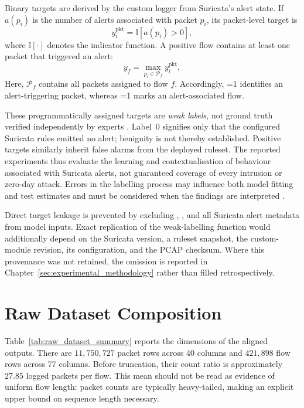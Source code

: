 \documentclass[11pt,fleqn]{report}
\begin{document}
Binary targets are derived by the custom logger from Suricata's alert state. If $a(p_i)$ is the number of alerts associated with packet $p_i$, its packet-level target is
\begin{equation}
    y_i^{\mathrm{pkt}}
    = \mathbb{I}\!\left[a(p_i)>0\right],
    \label{eq:packet_alert_label}
\end{equation}
where $\mathbb{I}[\cdot]$ denotes the indicator function. A positive flow contains at least one packet that triggered an alert:
\begin{equation}
    y_f
    = \max_{p_i\in\mathcal{P}_f} y_i^{\mathrm{pkt}},
    \label{eq:flow_alert_label}
\end{equation}
Here, $\mathcal{P}_f$ contains all packets assigned to flow $f$. Accordingly, =1 identifies an alert-triggering packet, whereas =1 marks an alert-associated flow.

These programmatically assigned targets are \emph{weak labels}, not ground truth verified independently by experts \cite{Ratner2017Snorkel}. Label~0 signifies only that the configured Suricata rules emitted no alert; benignity is not thereby established. Positive targets similarly inherit false alarms from the deployed ruleset. The reported experiments thus evaluate the learning and contextualisation of behaviour associated with Suricata alerts, not guaranteed coverage of every intrusion or zero-day attack. Errors in the labelling process may influence both model fitting and test estimates and must be considered when the findings are interpreted \cite{Northcutt2021ConfidentLearning}.

Direct target leakage is prevented by excluding , , and all Suricata alert metadata from model inputs. Exact replication of the weak-labelling function would additionally depend on the Suricata version, a ruleset snapshot, the custom-module revision, its configuration, and the PCAP checksum. Where this provenance was not retained, the omission is reported in Chapter~\ref{sec:experimental_methodology} rather than filled retrospectively.

\section{Raw Dataset Composition}
\label{subsec:raw_composition}

Table~\ref{tab:raw_dataset_summary} reports the dimensions of the aligned outputs. There are $11{,}750{,}727$ packet rows across 40 columns and $421{,}898$ flow rows across 77 columns. Before truncation, their count ratio is approximately $27.85$ logged packets per flow. This mean should not be read as evidence of uniform flow length: packet counts are typically heavy-tailed, making an explicit upper bound on sequence length necessary.
\end{document}
